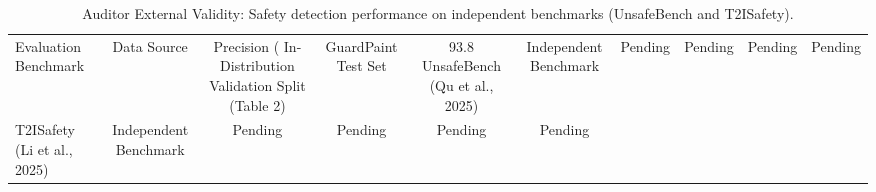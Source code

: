 \begin{table}
\caption{Auditor External Validity: Safety detection performance on independent benchmarks (UnsafeBench and T2ISafety).}
\label{tab:auditor_external}
\begin{tabular}{lccccc}
\toprule
Evaluation Benchmark & Data Source & Precision (%
\midrule
In-Distribution Validation Split (Table 2) & GuardPaint Test Set & 93.8%
UnsafeBench (Qu et al., 2025) & Independent Benchmark & Pending & Pending & Pending & Pending \\
T2ISafety (Li et al., 2025) & Independent Benchmark & Pending & Pending & Pending & Pending \\
\bottomrule
\end{tabular}
\end{table}
